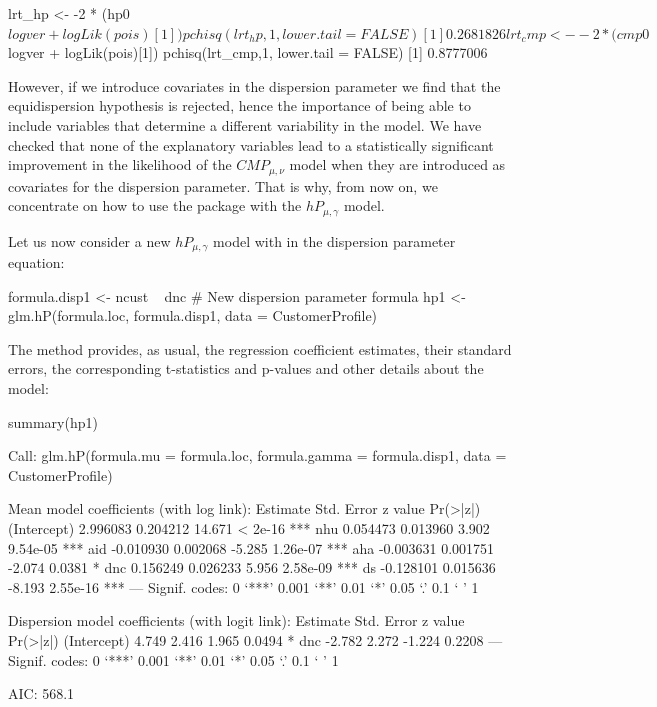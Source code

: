 \begin{example}
lrt_hp <- -2 * (hp0$logver + logLik(pois)[1])
pchisq(lrt_hp,1, lower.tail = FALSE)
[1] 0.2681826
lrt_cmp <- -2 * (cmp0$logver + logLik(pois)[1])
pchisq(lrt_cmp,1, lower.tail = FALSE)
[1] 0.8777006
\end{example}

However, if we introduce covariates in the dispersion parameter we find that the equidispersion hypothesis is rejected, hence the importance of being able to include variables that determine a different variability in the model. We have checked that none of the explanatory variables lead to a statistically significant improvement in the likelihood of the $CMP_{\mu, \nu}$ model when they are introduced as covariates for the dispersion parameter. That is why, from now on, we concentrate on how to use the package with the $hP_{\mu, \gamma}$ model.

Let us now consider a new $hP_{\mu, \gamma}$ model with  in the dispersion parameter equation:

\begin{example}
formula.disp1 <- ncust ~ dnc        # New dispersion parameter formula
hp1           <- glm.hP(formula.loc, formula.disp1, data = CustomerProfile)
\end{example}

The  method provides, as usual, the regression coefficient estimates, their standard errors, the corresponding t-statistics and p-values and other details about the model:

\begin{example}
summary(hp1)

Call:
glm.hP(formula.mu = formula.loc, formula.gamma = formula.disp1,
    data = CustomerProfile)

Mean model coefficients (with log link):
             Estimate Std. Error z value Pr(>|z|)
(Intercept)  2.996083   0.204212  14.671  < 2e-16 ***
nhu          0.054473   0.013960   3.902 9.54e-05 ***
aid         -0.010930   0.002068  -5.285 1.26e-07 ***
aha         -0.003631   0.001751  -2.074   0.0381 *
dnc          0.156249   0.026233   5.956 2.58e-09 ***
ds          -0.128101   0.015636  -8.193 2.55e-16 ***
---
Signif. codes:  0 ‘***’ 0.001 ‘**’ 0.01 ‘*’ 0.05 ‘.’ 0.1 ‘ ’ 1

Dispersion model coefficients (with logit link):
            Estimate Std. Error z value Pr(>|z|)
(Intercept)    4.749      2.416   1.965   0.0494 *
dnc           -2.782      2.272  -1.224   0.2208
---
Signif. codes:  0 ‘***’ 0.001 ‘**’ 0.01 ‘*’ 0.05 ‘.’ 0.1 ‘ ’ 1

AIC: 568.1
\end{example}

